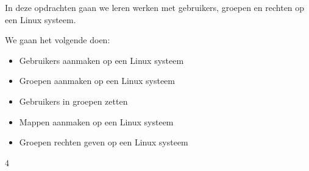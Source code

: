 In deze opdrachten gaan we leren werken met gebruikers, groepen en rechten op een Linux systeem.

We gaan het volgende doen:
\begin{itemize}
\item Gebruikers aanmaken op een Linux systeem
\item Groepen aanmaken op een Linux systeem
\item Gebruikers in groepen zetten
\item Mappen aanmaken op een Linux systeem
\item Groepen rechten geven op een Linux systeem
\end{itemize}4

